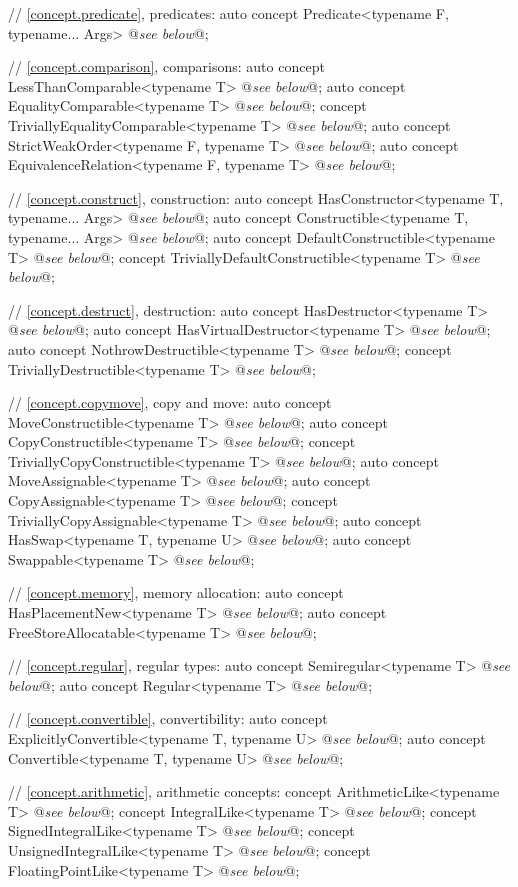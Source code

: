 \documentclass[american,twoside]{book}
\begin{document}
\begin{codeblock}
{  // \ref{concept.predicate}, predicates:
  auto concept Predicate<typename F, typename... Args> @\textit{see below}@;

  // \ref{concept.comparison}, comparisons:
  auto concept LessThanComparable<typename T> @\textit{see below}@;
  auto concept EqualityComparable<typename T> @\textit{see below}@;
  concept TriviallyEqualityComparable<typename T> @\textit{see below}@;
  auto concept StrictWeakOrder<typename F, typename T> @\textit{see below}@;
  auto concept EquivalenceRelation<typename F, typename T> @\textit{see below}@;

  // \ref{concept.construct}, construction:
  auto concept HasConstructor<typename T, typename... Args> @\textit{see below}@;
  auto concept Constructible<typename T, typename... Args> @\textit{see below}@;
  auto concept DefaultConstructible<typename T> @\textit{see below}@;
  concept TriviallyDefaultConstructible<typename T> @\textit{see below}@;

  // \ref{concept.destruct}, destruction:
  auto concept HasDestructor<typename T> @\textit{see below}@;
  auto concept HasVirtualDestructor<typename T> @\textit{see below}@;
  auto concept NothrowDestructible<typename T> @\textit{see below}@;
  concept TriviallyDestructible<typename T> @\textit{see below}@;

  // \ref{concept.copymove}, copy and move:
  auto concept MoveConstructible<typename T> @\textit{see below}@;
  auto concept CopyConstructible<typename T> @\textit{see below}@;
  concept TriviallyCopyConstructible<typename T> @\textit{see below}@;
  auto concept MoveAssignable<typename T> @\textit{see below}@;
  auto concept CopyAssignable<typename T> @\textit{see below}@;
  concept TriviallyCopyAssignable<typename T> @\textit{see below}@;
  auto concept HasSwap<typename T, typename U> @\textit{see below}@;
  auto concept Swappable<typename T> @\textit{see below}@;

  // \ref{concept.memory}, memory allocation:
  auto concept HasPlacementNew<typename T> @\textit{see below}@;
  auto concept FreeStoreAllocatable<typename T> @\textit{see below}@;

  // \ref{concept.regular}, regular types:
  auto concept Semiregular<typename T> @\textit{see below}@;
  auto concept Regular<typename T> @\textit{see below}@;

  // \ref{concept.convertible}, convertibility:
  auto concept ExplicitlyConvertible<typename T, typename U> @\textit{see below}@;
  auto concept Convertible<typename T, typename U> @\textit{see below}@;


  // \ref{concept.arithmetic}, arithmetic concepts:
  concept ArithmeticLike<typename T> @\textit{see below}@;
  concept IntegralLike<typename T> @\textit{see below}@;
  concept SignedIntegralLike<typename T> @\textit{see below}@;
  concept UnsignedIntegralLike<typename T> @\textit{see below}@;
  concept FloatingPointLike<typename T> @\textit{see below}@;
}
\end{codeblock}
\end{document}
